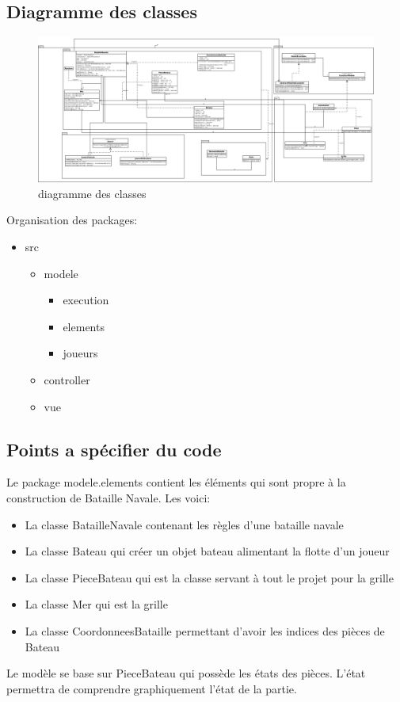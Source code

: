 \documentclass[12pt]{article}
\begin{document}
\subsection{Diagramme des classes}

\begin{figure}[ptbh]
\center

\includegraphics[width=1\textwidth]{./images/diagrame.png}
\caption{diagramme des classes\label{img:figure2}}
\end{figure}
Organisation des packages:
\begin{itemize}
    \item src \begin{itemize}
    				\item modele \begin{itemize}
    								\item execution
    								\item elements
    								\item joueurs
    							\end{itemize}
    				\item controller
    				\item vue
    			\end{itemize}
\end{itemize}

\subsection{Points a spécifier du code}
Le package modele.elements contient les éléments qui sont propre à la construction de Bataille Navale. Les voici:
\begin{itemize}
	\item La classe BatailleNavale contenant les règles d'une bataille navale
	\item La classe Bateau qui créer un objet bateau alimentant la flotte d'un joueur
	\item La classe PieceBateau qui est la classe servant à tout le projet pour la grille
	\item La classe Mer qui est la grille
	\item La classe CoordonneesBataille permettant d'avoir les indices des pièces de Bateau
\end{itemize}
Le modèle se base sur PieceBateau qui possède les états des pièces. L'état permettra de comprendre graphiquement l'état de la partie.
\end{document}
